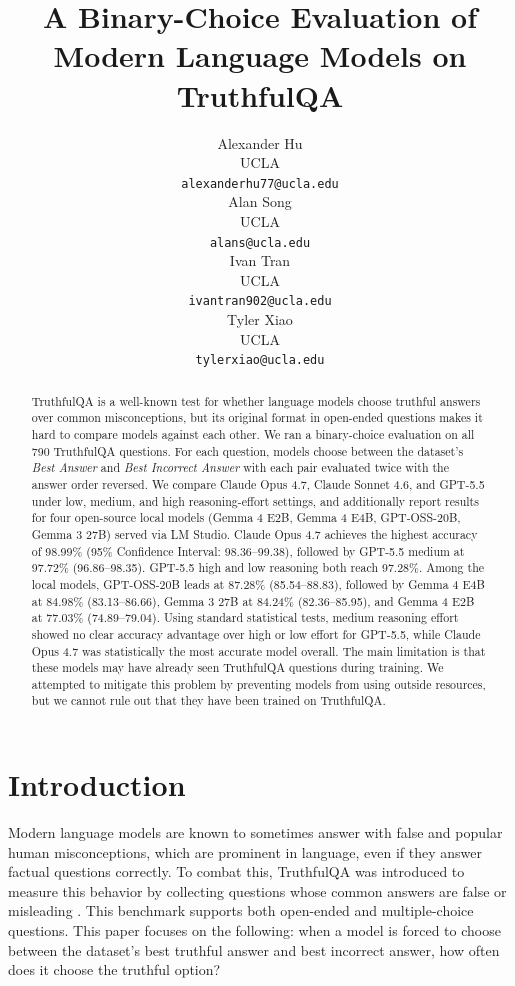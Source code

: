 \documentclass[11pt]{article}
\title{A Binary-Choice Evaluation of Modern Language Models on TruthfulQA}
\author{Alexander Hu \\
    UCLA \\ \texttt{alexanderhu77@ucla.edu} \\\And
    Alan Song \\
    UCLA \\ \texttt{alans@ucla.edu} \\\And
    Ivan Tran \\
    UCLA \\ \texttt{ivantran902@ucla.edu} \\\And
    Tyler Xiao \\
    UCLA \\ \texttt{tylerxiao@ucla.edu} \\}
\begin{document}
\maketitle
\begin{abstract}
TruthfulQA is a well-known test for whether language models choose truthful answers over common misconceptions, but its original format in open-ended questions makes it hard to compare models against each other.  We ran a binary-choice
evaluation on all 790 TruthfulQA questions.
For each question, models choose between the dataset's \emph{Best Answer} and
\emph{Best Incorrect Answer} with each pair evaluated twice with the answer order
reversed. We compare Claude Opus 4.7, Claude Sonnet 4.6, and GPT-5.5 under low, medium,
and high reasoning-effort settings, and additionally report results for four
open-source local models (Gemma 4 E2B, Gemma 4 E4B, GPT-OSS-20B, Gemma 3 27B)
served via LM Studio. Claude Opus 4.7 achieves the highest accuracy of 98.99\% (95\% Confidence Interval: 98.36--99.38), followed by GPT-5.5 medium at
97.72\% (96.86--98.35). GPT-5.5 high and low reasoning both reach 97.28\%. Among the local models, GPT-OSS-20B leads at 87.28\% (85.54--88.83), followed by Gemma 4 E4B at 84.98\% (83.13--86.66), Gemma 3 27B at 84.24\% (82.36--85.95), and
Gemma 4 E2B at 77.03\% (74.89--79.04).
Using standard statistical tests, medium reasoning effort showed no clear accuracy advantage over high or low effort for GPT-5.5, while Claude Opus 4.7 was statistically the most accurate model overall. The main limitation is that these
models may have already seen TruthfulQA questions during training. We attempted to mitigate this problem by preventing models from using outside resources, but we cannot rule out that they have been trained on TruthfulQA.
\end{abstract}

\section{Introduction}
Modern language models are known to sometimes answer with false and popular human misconceptions, which are prominent in language, even if they answer factual questions correctly.
To combat this, TruthfulQA was introduced to measure this behavior by
collecting questions whose common answers are false or misleading
\citep{lin2022truthfulqameasuringmodelsmimic}. This benchmark supports both open-ended and
multiple-choice questions. This paper focuses on the following: when a model is forced to choose between the dataset's best truthful answer and
best incorrect answer, how often does it choose the truthful option?
\end{document}
